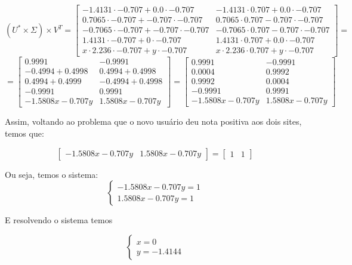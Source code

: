 \documentclass[11pt]{article}
\begin{document}
\begin{exerc}
\begin{enumerate}
\[
(U^* \times \Sigma) \times V^T = 
\begin{bmatrix}
	-1.4131 \cdot -0.707 + 0.0 \cdot -0.707 & -1.4131 \cdot 0.707 + 0.0 \cdot -0.707 \\
	0.7065 \cdot -0.707 + -0.707 \cdot -0.707 & 0.7065 \cdot 0.707 - 0.707 \cdot -0.707 \\
	-0.7065 \cdot -0.707 + -0.707 \cdot -0.707 & -0.7065 \cdot 0.707 - 0.707 \cdot -0.707 \\
	1.4131 \cdot -0.707 + 0 \cdot -0.707 & 1.4131 \cdot 0.707 + 0.0 \cdot -0.707 \\
	x \cdot 2.236 \cdot -0.707 + y \cdot -0.707 & x \cdot 2.236 \cdot 0.707 + y \cdot -0.707 
\end{bmatrix}
=
\]
\[
=
\begin{bmatrix}
	0.9991 & -0.9991 \\
	-0.4994 + 0.4998 & 0.4994 + 0.4998 \\
	0.4994 + 0.4999 & -0.4994 + 0.4998 \\
	-0.9991 & 0.9991 \\
	-1.5808 x - 0.707 y & 1.5808 x - 0.707 y
\end{bmatrix}
=
\begin{bmatrix}
	0.9991 & -0.9991 \\
	0.0004 & 0.9992 \\
	0.9992 & 0.0004 \\
	-0.9991 & 0.9991 \\
	-1.5808 x - 0.707 y & 1.5808 x - 0.707 y
\end{bmatrix}
\]

Assim, voltando ao problema que o novo usuário deu nota positiva aos dois sites, temos que:

\[
\begin{bmatrix}
	-1.5808 x - 0.707 y & 1.5808 x - 0.707 y
\end{bmatrix}
=
\begin{bmatrix}
	1 & 1
\end{bmatrix}
\]

Ou seja, temos o sistema:
$$\begin{cases} -1.5808 x - 0.707 y = 1 \\ 1.5808 x - 0.707 y = 1 \end{cases}$$

E resolvendo o sistema temos

$$\begin{cases} x = 0 \\ y = -1.4144 \end{cases}$$


\end{enumerate}
\end{exerc}
\end{document}

